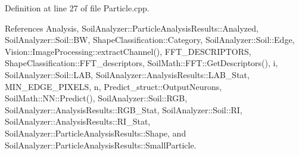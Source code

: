 Definition at line 27 of file Particle.\+cpp.



References Analysis, Soil\+Analyzer\+::\+Particle\+Analysis\+Results\+::\+Analyzed, Soil\+Analyzer\+::\+Soil\+::\+B\+W, Shape\+Classification\+::\+Category, Soil\+Analyzer\+::\+Soil\+::\+Edge, Vision\+::\+Image\+Processing\+::extract\+Channel(), F\+F\+T\+\_\+\+D\+E\+S\+C\+R\+I\+P\+T\+O\+R\+S, Shape\+Classification\+::\+F\+F\+T\+\_\+descriptors, Soil\+Math\+::\+F\+F\+T\+::\+Get\+Descriptors(), i, Soil\+Analyzer\+::\+Soil\+::\+L\+A\+B, Soil\+Analyzer\+::\+Analysis\+Results\+::\+L\+A\+B\+\_\+\+Stat, M\+I\+N\+\_\+\+E\+D\+G\+E\+\_\+\+P\+I\+X\+E\+L\+S, n, Predict\+\_\+struct\+::\+Output\+Neurons, Soil\+Math\+::\+N\+N\+::\+Predict(), Soil\+Analyzer\+::\+Soil\+::\+R\+G\+B, Soil\+Analyzer\+::\+Analysis\+Results\+::\+R\+G\+B\+\_\+\+Stat, Soil\+Analyzer\+::\+Soil\+::\+R\+I, Soil\+Analyzer\+::\+Analysis\+Results\+::\+R\+I\+\_\+\+Stat, Soil\+Analyzer\+::\+Particle\+Analysis\+Results\+::\+Shape, and Soil\+Analyzer\+::\+Particle\+Analysis\+Results\+::\+Small\+Particle.


